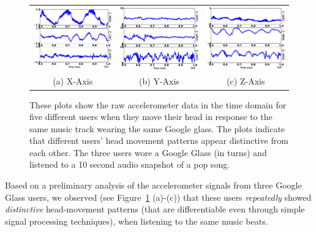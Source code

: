 \begin{figure}[t]
\begin{center}
\begin{tabular}{ccc}
\includegraphics [width=.31\linewidth]{figure/raw_x.eps}&
\includegraphics [width=.31\linewidth]{figure/raw_y.eps}&
\includegraphics [width=.31\linewidth]{figure/raw_z.eps}\\
(a) X-Axis & (b) Y-Axis & (c) Z-Axis \\
\end{tabular}
\end{center}
\caption{\label{fig:raw} These plots show the raw accelerometer data in the
time domain for five different users when they move their head in response to
the same music track wearing the same Google glass. The plots
indicate that different users' head movement patterns appear distinctive from
each other. The three users wore a Google Glass (in turns) and listened to a
10 second audio snapshot of a pop song.}
\vspace{-2pt}
\end{figure}


Based on a preliminary analysis of the accelerometer signals from three Google Glass
users, we observed (see Figure~\ref{fig:raw} (a)-(c))
that these users {\em repeatedly} showed {\em distinctive} head-movement patterns
(that are differentiable even through simple signal processing techniques),
when listening to the same music beats.




